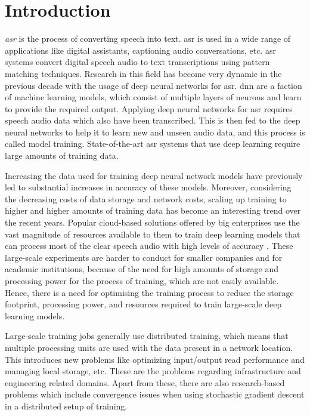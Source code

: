 \chapter{Introduction}
\label{chapter:intro}
\emph{\acrfull{asr}} is the process of converting speech into text. \acrshort{asr} is used in a wide range of applications like digital assistants,  captioning audio conversations, etc. \acrshort{asr} systems convert digital speech audio to text transcriptions using pattern matching techniques. Research in this field has become very dynamic in the previous decade with the usage of deep neural networks for \acrshort{asr}. \acrfull{dnn} are a faction of machine learning models, which consist of multiple layers of neurons and learn to provide the required output. Applying deep neural networks for \acrshort{asr} requires speech audio data which also have been transcribed. This is then fed to the deep neural networks to help it to learn new and unseen audio data, and this process is called model training. State-of-the-art \acrshort{asr} systems that use deep learning require large amounts of training data. 

Increasing the data used for training deep neural network models have previously led to substantial increases in accuracy of these models. Moreover, considering the decreasing costs of data storage and network costs, scaling up training to higher and higher amounts of training data has become an interesting trend over the recent years. Popular cloud-based solutions offered by big enterprises use the vast magnitude of resources available to them to train deep learning models that can process most of the clear speech audio with high levels of accuracy \cite{Li2020OnRecognition}. These large-scale experiments are harder to conduct for smaller companies and for academic institutions, because of the need for high amounts of storage and processing power for the process of training, which are not easily available. Hence, there is a need for optimising the training process to reduce the storage footprint, processing power, and resources required to train large-scale deep learning models.

Large-scale training jobs generally use distributed training, which means that multiple processing units are used with the data present in a network location. This introduces new problems like optimizing input/output read performance and managing local storage, etc. These are the problems regarding infrastructure and engineering related domains. Apart from these, there are also research-based problems which include convergence issues when using stochastic gradient descent in a distributed setup of training.  

